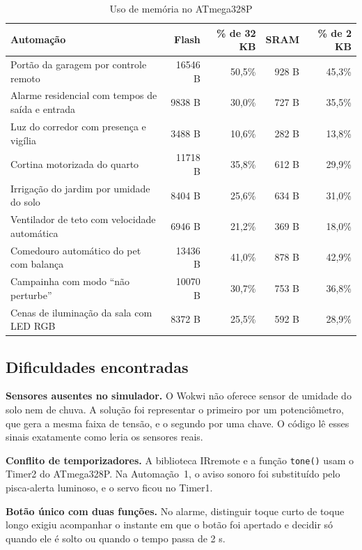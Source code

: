 \documentclass[12pt]{article}
\begin{document}
\begin{table}[ht]
\centering
\caption{Uso de memória no ATmega328P}\label{tab:mem}
\footnotesize
\begin{tabularx}{\textwidth}{Xrrrr}
\toprule
Automação & Flash & \% de 32 KB & SRAM & \% de 2 KB \\
\midrule
Portão da garagem por controle remoto & 16546 B & 50,5\% & 928 B & 45,3\% \\
Alarme residencial com tempos de saída e entrada & 9838 B & 30,0\% & 727 B & 35,5\% \\
Luz do corredor com presença e vigília & 3488 B & 10,6\% & 282 B & 13,8\% \\
Cortina motorizada do quarto & 11718 B & 35,8\% & 612 B & 29,9\% \\
Irrigação do jardim por umidade do solo & 8404 B & 25,6\% & 634 B & 31,0\% \\
Ventilador de teto com velocidade automática & 6946 B & 21,2\% & 369 B & 18,0\% \\
Comedouro automático do pet com balança & 13436 B & 41,0\% & 878 B & 42,9\% \\
Campainha com modo ``não perturbe'' & 10070 B & 30,7\% & 753 B & 36,8\% \\
Cenas de iluminação da sala com LED RGB & 8372 B & 25,5\% & 592 B & 28,9\% \\
\bottomrule
\end{tabularx}
\end{table}

\subsection{Dificuldades encontradas}

\textbf{Sensores ausentes no simulador.} O Wokwi não oferece sensor de umidade do solo nem de chuva. A solução foi representar o primeiro por um potenciômetro, que gera a mesma faixa de tensão, e o segundo por uma chave. O código lê esses sinais exatamente como leria os sensores reais.

\textbf{Conflito de temporizadores.} A biblioteca IRremote e a função \texttt{tone()} usam o Timer2 do ATmega328P. Na Automação~1, o aviso sonoro foi substituído pelo pisca-alerta luminoso, e o servo ficou no Timer1.

\textbf{Botão único com duas funções.} No alarme, distinguir toque curto de toque longo exigiu acompanhar o instante em que o botão foi apertado e decidir só quando ele é solto ou quando o tempo passa de 2 s.
\end{document}
